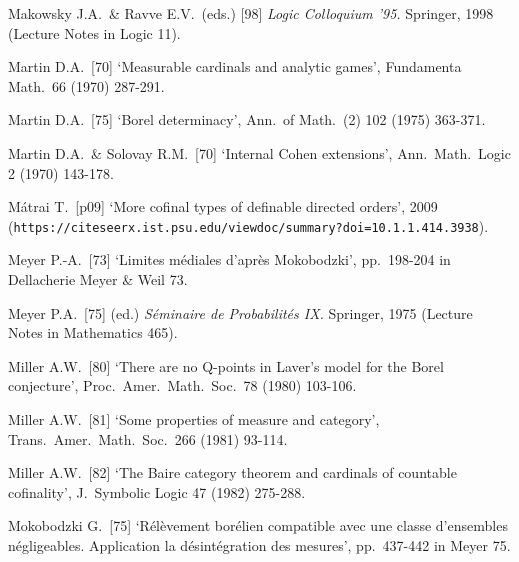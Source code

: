 {Makowsky J.A.\ \& Ravve E.V.\ (eds.) [98]
{\it Logic Colloquium '95.}  Springer, 1998 (Lecture Notes in Logic 11).


Martin D.A.\ [70] `Measurable cardinals and analytic games',
Fundamenta Math.\ 66 (1970) 287-291.
\cmmnt{[567N.]}

Martin D.A.\ [75] `Borel determinacy', Ann.\ of Math.\ (2) 102 (1975)
363-371.
\cmmnt{[\S567 {\it notes\/}.]}

Martin D.A.\ \& Solovay R.M.\ [70] `Internal Cohen
extensions', Ann.\ Math.\ Logic 2 (1970) 143-178.


M\'atrai T.\ [p09] `More cofinal types of definable directed orders', 2009
({\tt https://citeseerx.ist.psu.edu/viewdoc/summary?doi=10.1.1.414.3938}).
\cmmnt{[526L, \S526 {\it notes\/}.]}


Meyer P.-A.\ [73] `Limites m\'ediales d'apr\`es Mokobodzki',
pp.\ 198-204 in {\smc Dellacherie Meyer \& Weil 73}.
\cmmnt{[538Yl.]}

Meyer P.A.\ [75] (ed.) {\it S\'eminaire de Probabilit\'es IX.}
Springer, 1975 (Lecture Notes in Mathematics 465).

Miller A.W.\ [80] `There are no Q-points in Laver's model for the Borel
conjecture', Proc.\ Amer.\ Math.\ Soc.\ 78 (1980) 103-106.
\cmmnt{[\S538 {\it notes\/}.]}

Miller A.W.\ [81] `Some properties of measure and category',
Trans.\ Amer.\ Math.\ Soc.\ 266 (1981) 93-114.
\cmmnt{[522J.]}

Miller A.W.\ [82] `The Baire category theorem and cardinals of countable
cofinality', J.\ Symbolic Logic 47 (1982) 275-288.
\cmmnt{[552G, 552Xb.]}


Mokobodzki G.\ [75] `R\'el\`evement bor\'elien compatible avec une
classe d'ensembles n\'egligeables.  Application  la
d\'esint\'egration des mesures', pp.\ 437-442 in {\smc Meyer 75}.
\cmmnt{[535I.]}

}
